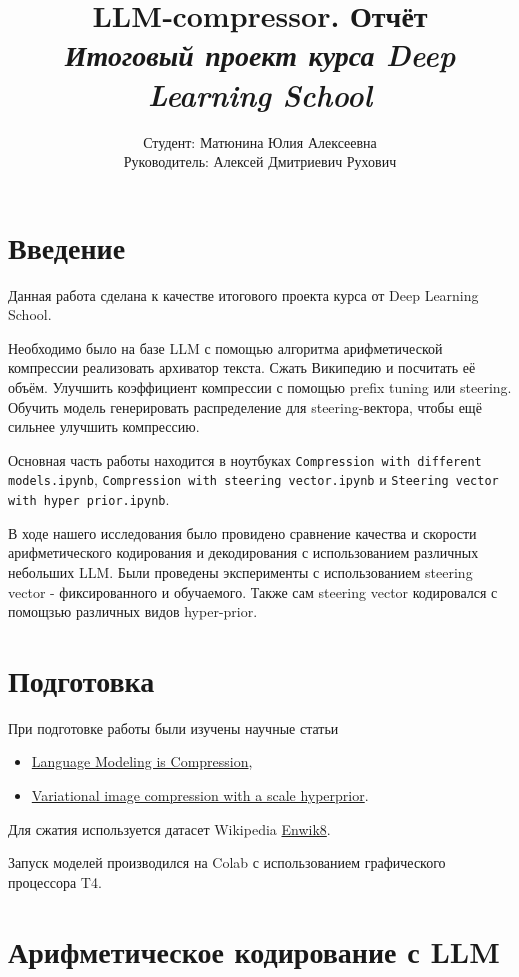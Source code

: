 \documentclass[a4paper,11pt]{article}
\title{%
  LLM‑compressor. Отчёт\\[0.5ex]
  {\large\itshape Итоговый проект курса Deep Learning School}%
}
\author{%
  Студент: Матюнина Юлия Алексеевна\\
  Руководитель: Алексей Дмитриевич Рухович%
}
\date{}
\begin{document}
\maketitle

\section*{Введение}

Данная работа сделана к качестве итогового проекта курса от Deep Learning School.

Необходимо было на базе LLM с помощью алгоритма арифметической компрессии реализовать архиватор текста. Сжать Википедию и посчитать её объём. Улучшить коэффициент компрессии с помощью prefix tuning или steering. Обучить модель генерировать распределение для steering-вектора, чтобы ещё сильнее улучшить компрессию.

Основная часть работы находится в ноутбуках \texttt{Compression with different models.ipynb}, \texttt{Compression with steering vector.ipynb} и \texttt{Steering vector with hyper prior.ipynb}.

В ходе нашего исследования было провидено сравнение качества и скорости арифметического кодирования и декодирования с использованием различных небольших LLM. Были проведены эксперименты с использованием steering vector - фиксированного и обучаемого.
Также сам steering vector кодировался с помощзью различных видов hyper-prior.

\section*{Подготовка}

При подготовке работы были изучены научные статьи
\begin{itemize}
  \item \href{https://arxiv.org/pdf/2309.10668}{Language Modeling is Compression},
  \item \href{https://arxiv.org/pdf/1802.01436}{Variational image compression with a scale hyperprior}.
\end{itemize}
Для сжатия используется датасет Wikipedia
\href{https://www.kaggle.com/datasets/nightfury1103/enwik8}{Enwik8}.

Запуск моделей производился на Colab с использованием графического процессора T4.

\section*{Арифметическое кодирование с LLM}
\end{document}
